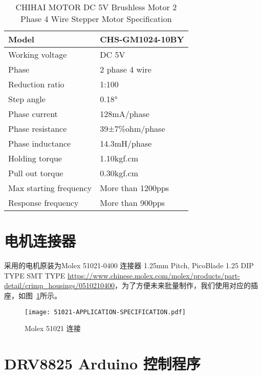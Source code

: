 \begin{table}[htbp]
    \centering
    \begin{tabular}{ll}
    \hline
    Model                  & CHS-GM1024-10BY   \\ \hline
    Working voltage        & DC 5V             \\ \hline
    Phase                  & 2 phase 4 wire    \\ \hline
    Reduction ratio        & 1:100             \\ \hline
    Step angle             & 0.18°             \\ \hline
    Phase current          & 128mA/phase       \\ \hline
    Phase resistance       & 39±7\%ohm/phase   \\ \hline
    Phase inductance       & 14.3mH/phase      \\ \hline
    Holding torque         & 1.10kgf.cm        \\ \hline
    Pull out torque        & 0.30kgf.cm        \\ \hline
    Max starting frequency & More than 1200pps \\ \hline
    Response frequency     & More than 900pps  \\ \hline
    \end{tabular}
    \caption{CHIHAI MOTOR DC 5V Brushless Motor 2 Phase 4 Wire Stepper Motor Specification}
    \label{tab:CHS-GM1024-10BY-Specific}
\end{table}

\section{电机连接器}

采用的电机原装为Molex 51021-0400 连接器 1.25mm Pitch, PicoBlade 1.25 DIP TYPE SMT TYPE \url{https://www.chinese.molex.com/molex/products/part-detail/crimp_housings/0510210400}，为了方便未来批量制作，我们使用对应的插座，如图~\ref{fig:51021-APPLICATION-SPECIFICATION}所示。

\begin{figure}[htbp]
    \centering
    \texttt{[image: 51021-APPLICATION-SPECIFICATION.pdf]}
    \caption{Molex 51021 连接}
    \label{fig:51021-APPLICATION-SPECIFICATION}
\end{figure}


\section{DRV8825 Arduino 控制程序}

